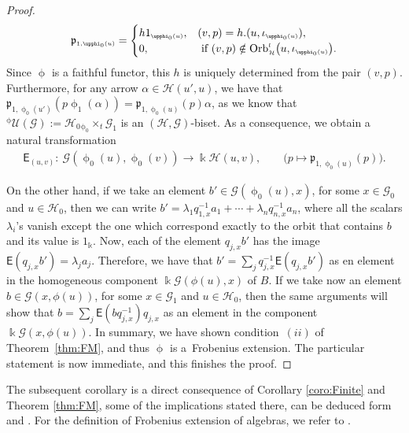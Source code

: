 \documentclass[10pt,a4paper]{amsart}
\numberwithin{equation}{section}
\newcommand{\Sf}[1]{\mathsf{#1}}
\newcommand{\fk}[1]{\mathfrak{#1}}
\newcommand{\Go}{\cG_{\Sscript{0}}}
\newcommand{\Ga}{\cG_{\Sscript{1}}}
\newcommand{\Ho}{\cH_{\Sscript{0}}}
\newcommand{\Orbit}[2]{{{\rm Orb}}_{\Sscript{\mathcal{#2}}}^{\Sscript{l}}\big(
#1 \big)}
\newcommand{\uU}{\mathscr{U}}
\newcommand{\cG}{{\mathcal G}}
\newcommand{\cH}{{\mathcal H}}
\newcommand{\Sscript}[1]{\scriptscriptstyle{#1}}
\newcommand{\due}[3]{{}_{{#2 }} {#1}_{{ #3}} }
\newcommand{\phio}{\upphi_{\Sscript{0}}}
\newcommand{\phia}{\upphi_{\Sscript{1}}}
\begin{document}
\begin{proof}
\begin{gather*}
\fk{p}_{\Sscript{1, \phio(u)}} = \begin{cases} h 1_{\Sscript{\phio(u)}}, & (v,p) = h . (u,\iota_{\Sscript{\phio(u)}}), \\ 0, & \text{ if } (v,p) \notin \Orbit{u, \iota_{\Sscript{\phio(u)}}}{H}. \end{cases}
\end{gather*}
Since $\upphi$ is a faithful functor, this $h$ is uniquely determined from the pair $(v,p)$. Furthermore, for any arrow $\alpha \in \cH(u',u)$, we have that $\fk{p}_{\Sscript{1,\phio(u')}} (p \phia(\alpha)) = \fk{p}_{\Sscript{1, \phio(u)}}(p) \alpha$, as we know that ${}^{\Sscript{\upphi}}\uU(\cG):=\Ho \due \times {\Sscript{\upphi_0}}{ \Sscript{t}} \Ga$ is an $(\cH,\cG)$-biset. As a consequence, we obtain a natural transformation
\begin{gather*}
\Sf{E}_{\Sscript{(u, v)}}\colon \ \cG(\phio(u), \phio(v)) \longrightarrow \Bbbk\cH(u,v), \qquad \big( p \longmapsto \fk{p}_{\Sscript{1, \phio(u)}}(p) \big).
\end{gather*}

 On the other hand, if we take an element $b' \in \cG(\phio(u), x)$, for some $x \in \Go$ and $u \in \Ho$, then we can write $b'= \lambda_{\Sscript{1}} q_{\Sscript{1, x}}^{-1} a_{\Sscript{1}} + \cdots + \lambda_{\Sscript{n}} q_{\Sscript{n, x}}^{-1} a_{\Sscript{n}}$, where all the scalars $\lambda_{\Sscript{i}}$'s vanish except the one which correspond exactly to the orbit that contains $b$ and its value is $1_{\Sscript{\Bbbk}}$. Now, each of the element $q_{\Sscript{j, x}} b'$ has the image $\Sf{E}(q_{\Sscript{j, x}} b') = \lambda_{\Sscript{j}} a_{\Sscript{j}}$. Therefore, we have that $b' =\sum_j q_{\Sscript{j, x}}^{-1} \Sf{E}(q_{\Sscript{j, x}} b')$ as en element in the homogeneous component $\Bbbk \cG(\phi(u), x)$ of $B$. If we take now an element $b \in \cG(x,\phi(u))$, for some $x \in \Ga$ and $u \in \Ho$, then the same arguments will show that $ b = \sum_j \Sf{E}(bq_{\Sscript{j, x}}^{-1}) q_{\Sscript{j, x}}$ as an element in the component $\Bbbk \cG(x,\phi(u))$. In summary, we have shown condition~$(ii)$ of Theorem~\ref{thm:FM}, and thus $\upphi$ is a~Frobenius extension. The particular statement is now immediate, and this finishes the proof.
\end{proof}

The subsequent corollary is a direct consequence of Corollary \ref{coro:Finite} and Theorem \ref{thm:FM}, some of the implications stated there, can be deduced form \cite[Example~1.7] {Kadison:1999} and \cite[pp.~36, 39]{Kowalski:2014}. For the definition of Frobenius extension of algebras, we refer to \cite[Definition 1.1] {Kadison:1999}.
\end{document}
